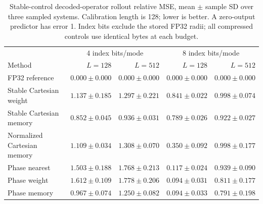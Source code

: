 \begin{table}[ht]
\centering\small
\caption{Stable-control decoded-operator rollout relative MSE, mean $\pm$ sample SD over three sampled systems. Calibration length is 128; lower is better. A zero-output predictor has error 1. Index bits exclude the stored FP32 radii; all compressed controls use identical bytes at each budget.}
\label{tab:memory}
\setlength{\tabcolsep}{3pt}
\begin{tabular}{lrrrr}
\toprule
& \multicolumn{2}{c}{4 index bits/mode} & \multicolumn{2}{c}{8 index bits/mode} \\
Method & $L=128$ & $L=512$ & $L=128$ & $L=512$ \\
\midrule
FP32 reference & $0.000\pm0.000$ & $0.000\pm0.000$ & $0.000\pm0.000$ & $0.000\pm0.000$ \\
Stable Cartesian weight & $1.137\pm0.185$ & $1.297\pm0.221$ & $0.841\pm0.022$ & $0.998\pm0.074$ \\
Stable Cartesian memory & $0.852\pm0.045$ & $0.936\pm0.031$ & $0.789\pm0.026$ & $0.922\pm0.027$ \\
Normalized Cartesian memory & $1.109\pm0.034$ & $1.308\pm0.070$ & $0.350\pm0.092$ & $0.998\pm0.177$ \\
Phase nearest & $1.503\pm0.188$ & $1.768\pm0.213$ & $0.117\pm0.024$ & $0.939\pm0.090$ \\
Phase weight & $1.612\pm0.109$ & $1.778\pm0.206$ & $0.094\pm0.031$ & $0.811\pm0.177$ \\
Phase memory & $0.967\pm0.074$ & $1.250\pm0.082$ & $0.094\pm0.033$ & $0.791\pm0.198$ \\
\bottomrule
\end{tabular}
\end{table}

